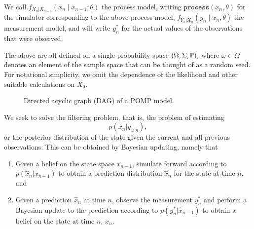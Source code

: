 \documentclass{article}
\begin{document}
We call $f_{X_n|X_{n-1}}\left(x_{n} \mid x_{n-1}; \theta\right)$ the process model, writing $\texttt{process}\left(x_n, \theta\right)$ for the simulator corresponding to the above process model, $f_{Y_n|X_n}\left(y_n \mid x_n, \theta\right)$ the measurement model, and will write $y_n^*$ for the actual values of the observations that were observed.

The above are all defined on a single probability space $(\Omega, \Sigma, \mathbb{P}),$ where $\omega \in \Omega$ denotes an element of the sample space that can be thought of as a random seed. For notational simplicity, we omit the dependence of the likelihood and other suitable calculations on $X_0.$




\begin{figure}[H]
\centering
{}
\caption{Directed acyclic graph (DAG) of a POMP model.}
\end{figure}

We seek to solve the filtering problem, that is, the problem of estimating
$$p(x_n|y_{1:n}),$$
or the posterior distribution of the state given the current and all previous observations. This can be obtained by Bayesian updating, namely that
\begin{enumerate}
    \item Given a belief on the state space $x_{n-1}$, simulate forward according to $p(\hat x_{n}|x_{n-1})$ to obtain a prediction distribution $\hat x_n$ for the state at time $n$, and
    \item Given a prediction $\hat{x}_n$ at time $n$, observe the measurement $y_n^*$ and perform a Bayesian update to the prediction according to $p(y_n^* | \hat x_{n-1})$ to obtain a belief on the state at time $n$, $x_n$. 
\end{enumerate}
\end{document}
